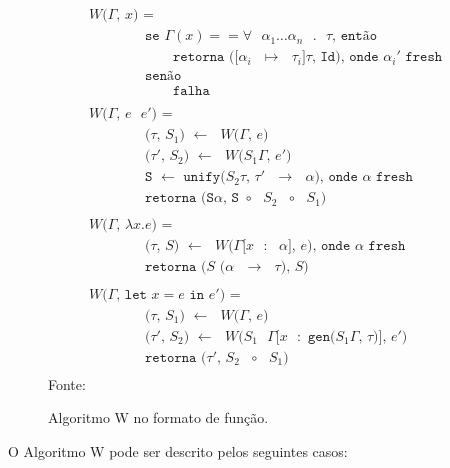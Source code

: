 \begin{figure}[ht!]
  \caption{Algoritmo W no formato de função.}
  \centering
  \begin{align*}
     & \texttt{$W$($\Gamma$, $x$) = } \\
     & \qquad{}\qquad{}\texttt{se $\Gamma(x) == \forall$ $\alpha_1 \ldots \alpha_n$ $.$ $\tau$, então} \\
     & \qquad{}\qquad{}\qquad{}\texttt{retorna ([$\alpha_i$ $\mapsto$ $\tau_i$]$\tau$, Id), onde $\alpha_i'$ fresh} \\
     & \qquad{}\qquad{}\texttt{senão} \\
     & \qquad{}\qquad{}\qquad{}\texttt{falha} \\
     \\
     & \texttt{$W$($\Gamma$, $e$ $e'$) = } \\
     & \qquad{}\qquad{}\texttt{($\tau$, $S_1$) $\leftarrow$ $W$($\Gamma$, $e$)} \\
     & \qquad{}\qquad{}\texttt{($\tau'$, $S_2$) $\leftarrow$ $W$($S_1\Gamma$, $e'$)} \\
     & \qquad{}\qquad{}\texttt{S $\leftarrow$ unify($S_2\tau$, $\tau'$ $\to$ $\alpha$), onde $\alpha$ fresh} \\
     & \qquad{}\qquad{}\texttt{retorna (S$\alpha$, S $\circ$ $S_2$ $\circ$ $S_1$)} \\
     \\
     & \texttt{$W$($\Gamma$, $\lambda x.e$) = } \\
     & \qquad{}\qquad{}\texttt{($\tau$, $S$) $\leftarrow$ $W$($\Gamma$[$x$ $:$ $\alpha$], $e$), onde $\alpha$ fresh} \\
     & \qquad{}\qquad{}\texttt{retorna ($S$ ($\alpha$ $\to$ $\tau$), $S$)} \\
     \\
     & \texttt{$W$($\Gamma$, let $x = e$ in $e'$) = } \\
     & \qquad{}\qquad{}\texttt{($\tau$, $S_1$) $\leftarrow$ $W$($\Gamma$, $e$)} \\
     & \qquad{}\qquad{}\texttt{($\tau'$, $S_2$) $\leftarrow$ $W$($S_1$ $\Gamma$[$x$ $:$ gen($S_1\Gamma$, $\tau$)], $e'$)} \\
     & \qquad{}\qquad{}\texttt{retorna ($\tau'$, $S_2$ $\circ$ $S_1$)} \\
  \end{align*}
  \small{Fonte:~\cite{CASTRO2019}}\label{fig:algoritmo-w}
\end{figure}

O Algoritmo W pode ser descrito pelos seguintes casos:

